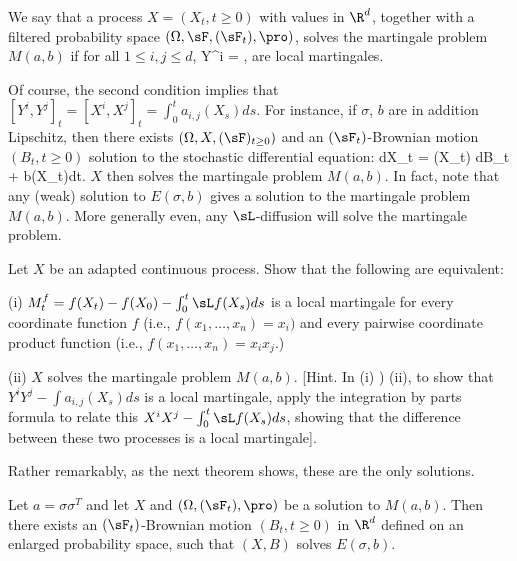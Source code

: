 \begin{definition}
We say that a process $X = (X_t, t \geq 0)$ with values in $\R^d$, together with a filtered probability space $(\Omega,\sF, (\sF_t),\pro)$, solves the martingale problem $M(a, b)$ if for all $1 \leq i, j \leq d$,
\be
Y^i = ,\quad\quad {}
\ee
are local martingales.
\end{definition}

Of course, the second condition implies that $[Y^i, Y^j ]_t = [X^i,X^j ]_t = \int^t_0 a_{i,j}(X_s)ds$. For instance, if $\sigma$, $b$ are in addition Lipschitz, then there exists $(\Omega,X, (\sF)_{t\geq0})$ and an $(\sF_t)$-Brownian motion $(B_t, t \geq 0)$ solution to the stochastic differential equation:
\be
dX_t = \sigma(X_t) \cdot dB_t + b(X_t)dt.
\ee
$X$ then solves the martingale problem $M(a, b)$. In fact, note that any (weak) solution to $E(\sigma, b)$ gives a solution to the martingale problem $M(a, b)$. More generally even, any $\sL$-diffusion will solve the martingale problem.

\begin{problem}
Let $X$ be an adapted continuous process. Show that the following are equivalent:
\ben
\item [(i)] $M^f_t = f(X_t) - f(X_0) - \int^t_0 \sL f(X_s)ds$ is a local martingale for every coordinate function $f$ (i.e., $f(x_1,\dots, x_n) = x_i)$ and every pairwise coordinate product function (i.e., $f(x_1,\dots, x_n) = x_ix_j$.)
\item [(ii)] $X$ solves the martingale problem $M(a, b)$. [Hint. In (i) ) (ii), to show that $Y^iY^j - \int a_{i,j}(X_s)ds$ is a local martingale, apply the
integration by parts formula to relate this $X^iX^j - \int^t_0 \sL f(X_s)ds$, showing that the difference between these two processes is a local martingale].
\een
\end{problem}

Rather remarkably, as the next theorem shows, these are the only solutions.

\begin{theorem}\label{thm:m_solution}
Let $a = \sigma\sigma^T$ and let $X$ and $(\Omega, (\sF_t), \pro)$ be a solution to $M(a, b)$. Then there exists an $(\sF_t)$-Brownian motion $(B_t, t \geq 0)$ in $\R^d$ defined on an enlarged probability space, such that $(X,B)$ solves $E(\sigma, b)$.
\end{theorem}

